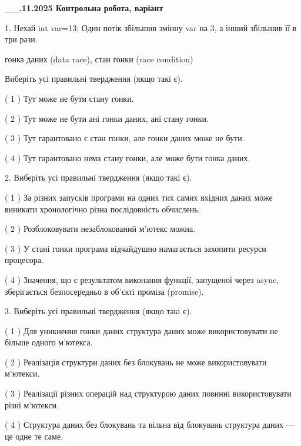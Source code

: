 \documentclass[12pt, ukrainian]{article}
\begin{document}
\newpage
\begin {large}

\textbf{\_\_.11.2025 Контрольна робота, варіант  }\par


{
1. Нехай int var=13; Один потік збільшив змінну var на 3, а інший збільшив її в три рази.

гонка даних (data race), стан гонки (race condition)

Виберіть усі правильні твердження (якщо такі є).\par
\vspace{2mm}
( 1 ) Тут може не бути стану гонки.%

( 2 ) Тут може не бути ані гонки даних, ані стану гонки.%

( 3 ) Тут гарантовано є стан гонки, але гонки даних може не бути.%

( 4 ) Тут гарантовано нема стану гонки, але може бути гонка даних.%


2. Виберіть усі правильні твердження (якщо такі є).\par
\vspace{2mm}

( 1 ) За різних запусків програми на одних тих самих вхідних даних може виникати хронологічно різна послідовність обчислень.%

( 2 ) Розблоковувати незаблокований м’ютекс можна.%

( 3 ) У стані гонки програма відчайдушно намагається захопити ресурси процесора.%

( 4 ) Значення, що є результатом виконання функції, запущеної через async, зберігається безпосередньо в об’єкті проміза (promise).%


3. Виберіть усі правильні твердження (якщо такі є).\par
\vspace{2mm}

( 1 ) Для уникнення гонки даних структура даних може використовувати не більше одного м’ютекса.%

( 2 ) Реалізація структури даних без блокувань не може використовувати м’ютекси.%

( 3 ) Реалізації різних операцій над структурою даних повинні використовувати різні м’ютекси.%

( 4 ) Структура даних без блокувань та вільна від блокувань структура даних --- це одне те саме.%


}
\end{large}
\end{document}
